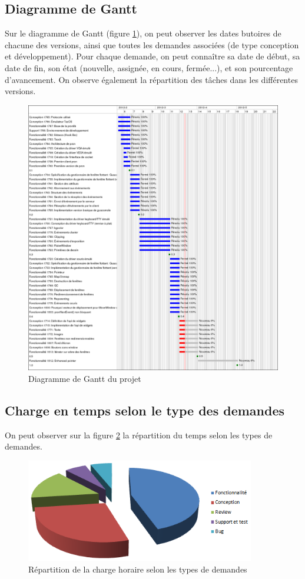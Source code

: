 \subsection{Diagramme de Gantt}
\label{taches}
Sur le diagramme de Gantt (figure \ref{fig:diagGant}), on peut observer les dates butoires de chacune des versions, ainsi que toutes les demandes associées (de type conception et développement). Pour chaque demande, on peut connaître sa date de début, sa date de fin, son état (nouvelle, assignée, en cours, fermée...), et son pourcentage d'avancement. On observe également la répartition des tâches dans les différentes versions.
\begin{figure}[H]
  \centering
    \includegraphics[width=15cm]{figures/tacos-gui-gantt}
  \caption{\label{fig:diagGant}Diagramme de Gantt du projet}
\end{figure}

\subsection{Charge en temps selon le type des demandes}
On peut observer sur la figure \ref{fig:pie} la répartition du temps selon les types de demandes.
\begin{figure}[H]
  \centering
    \includegraphics[width=10cm]{figures/pie}
  \caption{\label{fig:pie}Répartition de la charge horaire selon les types de demandes}
\end{figure}
